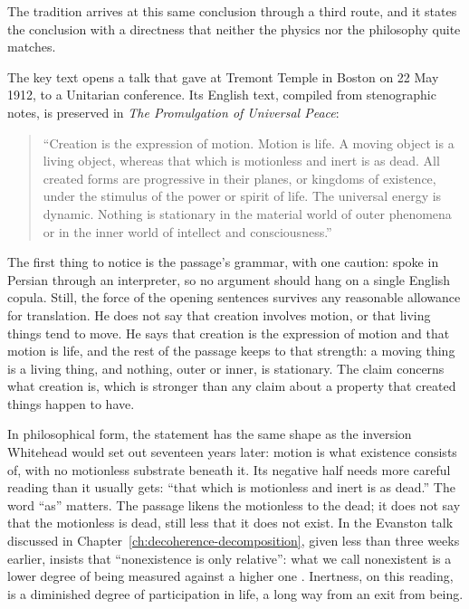 The \bahai tradition arrives at this same conclusion through a third route, and it states the conclusion with a directness that neither the physics nor the philosophy quite matches.

The key text opens a talk that \AbdulBaha gave at Tremont Temple in Boston on 22 May 1912, to a Unitarian conference. Its English text, compiled from stenographic notes, is preserved in \textit{The Promulgation of Universal Peace}:

\begin{quote}
``Creation is the expression of motion. Motion is life. A moving object is a living object, whereas that which is motionless and inert is as dead. All created forms are progressive in their planes, or kingdoms of existence, under the stimulus of the power or spirit of life. The universal energy is dynamic. Nothing is stationary in the material world of outer phenomena or in the inner world of intellect and consciousness.'' \citep[Talk 52]{PUP}
\end{quote}

The first thing to notice is the passage's grammar, with one caution: \AbdulBaha spoke in Persian through an interpreter, so no argument should hang on a single English copula. Still, the force of the opening sentences survives any reasonable allowance for translation. He does not say that creation involves motion, or that living things tend to move. He says that creation is the expression of motion and that motion is life, and the rest of the passage keeps to that strength: a moving thing is a living thing, and nothing, outer or inner, is stationary. The claim concerns what creation is, which is stronger than any claim about a property that created things happen to have.

In philosophical form, the statement has the same shape as the inversion Whitehead would set out seventeen years later: motion is what existence consists of, with no motionless substrate beneath it. Its negative half needs more careful reading than it usually gets: ``that which is motionless and inert is as dead.'' The word ``as'' matters. The passage likens the motionless to the dead; it does not say that the motionless is dead, still less that it does not exist. In the Evanston talk discussed in Chapter~\ref{ch:decoherence-decomposition}, given less than three weeks earlier, \AbdulBaha insists that ``nonexistence is only relative'': what we call nonexistent is a lower degree of being measured against a higher one \citep[Talk 38]{PUP}. Inertness, on this reading, is a diminished degree of participation in life, a long way from an exit from being.

